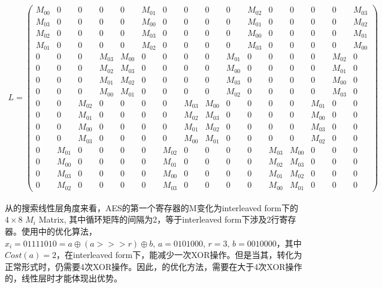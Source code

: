 \documentclass[11pt,a4paper]{article}
\begin{document}
\begin{eqnarray*}
  L = \left(\begin{array}{rrrrrrrrrrrrrrrr}
    M_{00} & 0 & 0 & 0 & 0 & M_{01} & 0 & 0 & 0 & 0 & M_{02} & 0 & 0 & 0 & 0 & M_{03} \\
    M_{03} & 0 & 0 & 0 & 0 & M_{00} & 0 & 0 & 0 & 0 & M_{01} & 0 & 0 & 0 & 0 & M_{02} \\
    M_{02} & 0 & 0 & 0 & 0 & M_{03} & 0 & 0 & 0 & 0 & M_{00} & 0 & 0 & 0 & 0 & M_{01} \\
    M_{01} & 0 & 0 & 0 & 0 & M_{02} & 0 & 0 & 0 & 0 & M_{03} & 0 & 0 & 0 & 0 & M_{00} \\
    0 & 0 & 0 & M_{03} & M_{00} & 0 & 0 & 0 & 0 & M_{01} & 0 & 0 & 0 & 0 & M_{02} & 0 \\
    0 & 0 & 0 & M_{02} & M_{03} & 0 & 0 & 0 & 0 & M_{00} & 0 & 0 & 0 & 0 & M_{01} & 0 \\
    0 & 0 & 0 & M_{01} & M_{02} & 0 & 0 & 0 & 0 & M_{03} & 0 & 0 & 0 & 0 & M_{00} & 0 \\
    0 & 0 & 0 & M_{00} & M_{01} & 0 & 0 & 0 & 0 & M_{02} & 0 & 0 & 0 & 0 & M_{03} & 0 \\
    0 & 0 & M_{02} & 0 & 0 & 0 & 0 & M_{03} & M_{00} & 0 & 0 & 0 & 0 & M_{01} & 0 & 0 \\
    0 & 0 & M_{01} & 0 & 0 & 0 & 0 & M_{02} & M_{03} & 0 & 0 & 0 & 0 & M_{00} & 0 & 0 \\
    0 & 0 & M_{00} & 0 & 0 & 0 & 0 & M_{01} & M_{02} & 0 & 0 & 0 & 0 & M_{03} & 0 & 0 \\
    0 & 0 & M_{03} & 0 & 0 & 0 & 0 & M_{00} & M_{01} & 0 & 0 & 0 & 0 & M_{02} & 0 & 0 \\
    0 & M_{01} & 0 & 0 & 0 & 0 & M_{02} & 0 & 0 & 0 & 0 & M_{03} & M_{00} & 0 & 0 & 0 \\
    0 & M_{00} & 0 & 0 & 0 & 0 & M_{01} & 0 & 0 & 0 & 0 & M_{02} & M_{03} & 0 & 0 & 0 \\
    0 & M_{03} & 0 & 0 & 0 & 0 & M_{00} & 0 & 0 & 0 & 0 & M_{01} & M_{02} & 0 & 0 & 0 \\
    0 & M_{02} & 0 & 0 & 0 & 0 & M_{03} & 0 & 0 & 0 & 0 & M_{00} & M_{01} & 0 & 0 & 0
    \end{array}\right)
\end{eqnarray*}

从\cite{Leurent2024}的搜索线性层角度来看，AES的第一个寄存器的M变化为interleaved form下的$4\times8$ $M_i$ Matrix, 其中循环矩阵的间隔为2，等于interleaved form下涉及2行寄存器。使用\cite{Leurent2024}中的优化算法，$x_i=01111010=a\oplus(a>>>r)\oplus b,\,a=0101000,\,r=3,\,b=0010000$，其中$Cost(a)=2$，在interleaved form下，能减少一次XOR操作。但是当其，转化为正常形式时，仍需要4次XOR操作。因此，\cite{Leurent2024}的优化方法，需要在大于4次XOR操作的，线性层时才能体现出优势。
\end{document}
